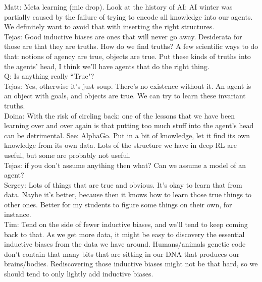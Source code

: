 Matt: Meta learning (mic drop). Look at the history of AI: AI winter was partially caused by the failure of trying to encode all knowledge into our agents. We definitely want to avoid that with inserting the right structures.\\

Tejas: Good inductive biases are ones that will never go away. Desiderata for those are that they are truths. How do we find truths? A few scientific ways to do that: notions of agency are true, objects are true. Put these kinds of truths into the agents' head, I think we'll have agents that do the right thing. \\

Q: Is anything really ``True"? \\

Tejas: Yes, otherwise it's just soup. There's no existence without it. An agent is an object with goals, and objects are true. We can try to learn these invariant truths. \\

Doina: With the risk of circling back: one of the lessons that we have been learning over and over again is that putting too much stuff into the agent's head can be detrimental. See: AlphaGo. Put in a bit of knowledge, let it find its own knowledge from its own data. Lots of the structure we have in deep RL are useful, but some are probably not useful. \\

Tejas: if you don't assume anything then what? Can we assume a model of an agent? \\

Sergey: Lots of things that are true and obvious. It's okay to learn that from data. Naybe it's better, because then it knows how to learn those true things to other ones. Better for my students to figure some things on their own, for instance. \\

Tim: Tend on the side of fewer inductive biases, and we'll tend to keep coming back to that. As we get more data, it might be easy to discovery the essential inductive biases from the data we have around. Humans/animals genetic code don't contain that many bits that are sitting in our DNA that produces our brains/bodies. Rediscovering those inductive biases might not be that hard, so we should tend to only lightly add inductive biases. \\

\spacerule

